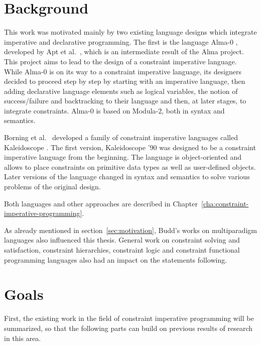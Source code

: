 \section{Background}
\label{sec:background}

This work was motivated mainly by two existing language designs which
integrate imperative and declarative programming.  The first is the
language Alma-0%
, developed by Apt%
 et al.~\cite{apt97search, apt98alma, apt98almaproject},
which is an intermediate result of the Alma%
 project.  This project aims to lead to the design of a
constraint imperative language.  While Alma-0 is on its way to a
constraint imperative language, its designers decided to proceed
step by step by starting with an imperative language, then adding
declarative language elements such as logical variables, the notion of
success/failure and backtracking to their language and then, at later
stages, to integrate constraints.  Alma-0 is based on Modula-2, both
in syntax and semantics.

Borning%
 et
al.~\cite{lopez94kaleidoscope,freemanbenson90design} developed a
family of constraint imperative languages called Kaleidoscope%
.  The first version, Kaleidoscope '90 was
designed to be a constraint imperative language from the beginning.
The language is object-oriented and allows to place constraints on
primitive data types as well as user-defined objects. Later versions
of the language changed in syntax and semantics to solve various
problems of the original design.

Both languages and other approaches are described in
Chapter~\ref{cha:constraint-imperative-programming}.

As already mentioned in section~\ref{sec:motivation}, Budd's works on
multiparadigm languages also influenced this thesis. General work on
constraint solving and satisfaction, constraint hierarchies,
constraint logic and constraint functional programming languages also
had an impact on the statements following.


\section{Goals}
\label{sec:goals}

First, the existing work in the field of constraint imperative
programming will be summarized, so that the following parts can build
on previous results of research in this area.

